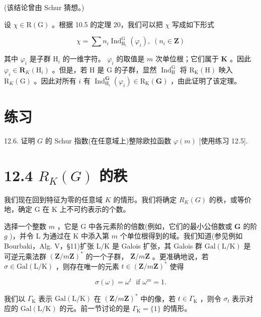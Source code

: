 \documentclass[10pt]{article}
\begin{document}
(该结论曾由 Schur 猜想。)

设 \(\chi  \in  \mathrm{R}\left( \mathrm{G}\right)\) 。根据 10.5 的定理 20，我们可以把 \(\chi\) 写成如下形式

\[
\chi  = \sum {n}_{i}{\operatorname{Ind}}_{{\mathrm{H}}_{i}}^{\mathrm{G}}\left( {\varphi }_{i}\right) ,\;\left( {{n}_{i} \in  \mathbf{Z}}\right)
\]

其中 \({\varphi }_{i}\) 是子群 \({\mathrm{H}}_{i}\) 的一维字符。 \({\varphi }_{i}\) 的取值是 \(m\) 次单位根；它们属于 \(\mathbf{K}\) 。因此 \({\varphi }_{i} \in  {\mathbf{R}}_{K}\left( {\mathrm{H}}_{i}\right)\) 。但是，若 \(\mathrm{H}\) 是 \(\mathrm{G}\) 的子群，显然 \({\operatorname{Ind}}_{\mathrm{H}}^{\mathrm{G}}\) 将 \({\mathrm{R}}_{\mathrm{K}}\left( \mathrm{H}\right)\) 映入 \({\mathrm{R}}_{K}\left( \mathrm{G}\right)\) 。因此对所有 \(i\) 有 \({\operatorname{Ind}}_{{\mathrm{H}}_{i}}^{\mathbf{G}}\left( {\varphi }_{i}\right)  \in  {\mathrm{R}}_{\mathrm{K}}\left( \mathbf{G}\right)\) ，由此证明了该定理。

\section*{练习}

12.6. 证明 \(G\) 的 Schur 指数(在任意域上)整除欧拉函数 \(\varphi \left( m\right)\) [使用练习 12.5].

\section*{12.4 \({R}_{K}\left( G\right)\) 的秩}

我们现在回到特征为零的任意域 \(K\) 的情形。我们将确定 \({R}_{K}\left( G\right)\) 的秩，或等价地，确定 \(\mathrm{G}\) 在 \(\mathrm{K}\) 上不可约表示的个数。

选择一个整数 \(m\) ，它是 G 中各元素阶的倍数(例如，它们的最小公倍数或 \(\mathbf{G}\) 的阶 \(g\) )，并令 L 为通过在 \(\mathrm{K}\) 中添入第 \(m\) 个单位根得到的域。我们知道(参见例如 Bourbaki，Alg. V，§11)扩张 L/K 是 Galois 扩张，其 Galois 群 \(\mathrm{{Gal}}\left( {\mathrm{L}/\mathrm{K}}\right)\) 是可逆元乘法群 \({\left( \mathbf{Z}/m\mathbf{Z}\right) }^{ * }\) 的一个子群， \(\mathbf{Z}/m\mathbf{Z}\) 。更准确地说，若 \(\sigma  \in  \mathrm{{Gal}}\left( {\mathrm{L}/\mathrm{K}}\right)\) ，则存在唯一的元素 \(t \in  {\left( \mathbf{Z}/m\mathbf{Z}\right) }^{ * }\) 使得

\[
\sigma \left( \omega \right)  = {\omega }^{t}\;\text{ if }{\omega }^{m} = 1.
\]

我们以 \({\Gamma }_{\mathrm{K}}\) 表示 \(\mathrm{{Gal}}\left( {\mathrm{L}/\mathrm{K}}\right)\) 在 \({\left( \mathbf{Z}/m\mathbf{Z}\right) }^{ * }\) 中的像，若 \(t \in  {\Gamma }_{\mathrm{K}}\) ，则令 \({\sigma }_{t}\) 表示对应的 \(\mathrm{{Gal}}\left( {\mathrm{L}/\mathrm{K}}\right)\) 的元。前一节讨论的是 \({\Gamma }_{\mathrm{K}} = \{ 1\}\) 的情形。
\end{document}
